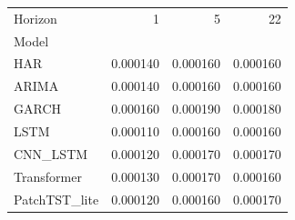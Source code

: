 \begin{tabular}{lrrr}
\toprule
Horizon & 1 & 5 & 22 \\
Model &  &  &  \\
\midrule
HAR & 0.000140 & 0.000160 & 0.000160 \\
ARIMA & 0.000140 & 0.000160 & 0.000160 \\
GARCH & 0.000160 & 0.000190 & 0.000180 \\
LSTM & 0.000110 & 0.000160 & 0.000160 \\
CNN_LSTM & 0.000120 & 0.000170 & 0.000170 \\
Transformer & 0.000130 & 0.000170 & 0.000160 \\
PatchTST_lite & 0.000120 & 0.000160 & 0.000170 \\
\bottomrule
\end{tabular}

